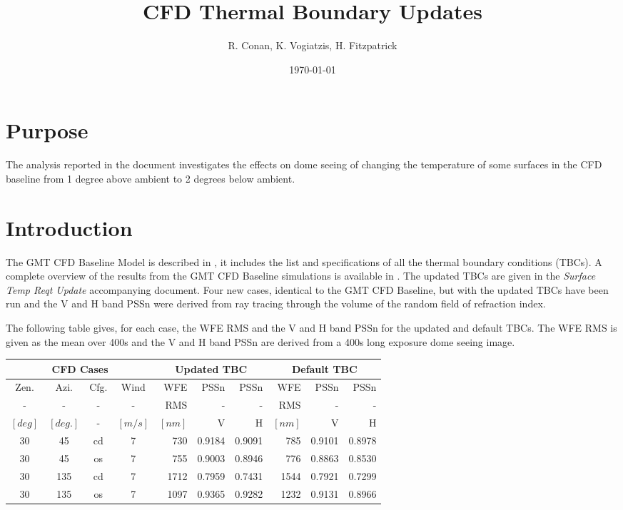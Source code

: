 \documentclass{gmto}
\title{CFD Thermal Boundary Updates}
\author{R. Conan, K. Vogiatzis, H. Fitzpatrick}
\date{\today}
\begin{document}
\maketitle
\tableofcontents
\listoffigures
\listoftables

\clearpage

\section{Purpose}
\label{sec:purpose}

The analysis reported in the document investigates the effects on dome seeing of changing the temperature of some surfaces in the CFD baseline from 1 degree above ambient to 2 degrees below ambient.

\section{Introduction}
\label{sec:introduction}

The GMT CFD Baseline Model is described in \cite{GMT.DOC.05211}, it includes the list and specifications of all the thermal boundary conditions (TBCs).
A complete overview of the results from the GMT CFD Baseline simulations is available in \cite{GMT.DOC.05214}.
The updated TBCs are given in the \emph{Surface Temp Reqt Update} accompanying document.
Four new cases, identical to the GMT CFD Baseline, but with the updated TBCs have been run and the V and H band PSSn were derived from ray tracing through the volume of the random field of refraction index.

The following table gives, for each case, the WFE RMS and the V and H band PSSn for the updated and default TBCs.
The WFE RMS is given as the mean over 400s and the V and H band PSSn are derived from a 400s long exposure dome seeing image.
\begin{longtable}{*{4}{c}|*{3}{r}|*{3}{r}}\toprule
 \multicolumn{4}{c|}{\textbf{CFD Cases}} & \multicolumn{3}{|c|}{\textbf{Updated TBC}} & \multicolumn{3}{|c}{\textbf{Default TBC}} \\\midrule
  Zen. & Azi. & Cfg. & Wind & WFE & PSSn & PSSn & WFE & PSSn & PSSn \\
  - & -    & -    &  -   & RMS & -  & - & RMS & - & -  \\
  $[deg]$  & $[deg.]$ & - & $[m/s]$ & $[nm]$& V & H & $[nm]$ & V & H \\\hline
   30 &  45 & cd &  7 &    730 & 0.9184 & 0.9091 &    785 & 0.9101 & 0.8978 \\
  30 &  45 & os &  7 &    755 & 0.9003 & 0.8946 &    776 & 0.8863 & 0.8530 \\
  30 & 135 & cd &  7 &   1712 & 0.7959 & 0.7431 &   1544 & 0.7921 & 0.7299 \\
  30 & 135 & os &  7 &   1097 & 0.9365 & 0.9282 &   1232 & 0.9131 & 0.8966 \\
\bottomrule
\end{longtable}
\end{document}
